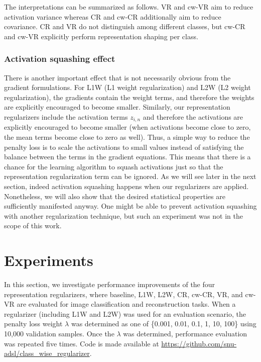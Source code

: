 The interpretations can be summarized as follows. VR and cw-VR aim to reduce activation variance whereas CR and cw-CR additionally aim to reduce covariance. CR and VR do not distinguish among different classes, but cw-CR and cw-VR explicitly perform representation shaping per class.

\subsubsection{Activation squashing effect}
There is another important effect that is not necessarily obvious from the gradient formulations.
For L1W (L1 weight regularization) and L2W (L2 weight regularization), the gradients contain the weight terms, and therefore the weights are explicitly encouraged to become smaller. Similarly, our representation regularizers include the activation terms $z_{i,n}$ and therefore the activations are explicitly encouraged to become smaller (when activations become close to zero, the mean terms become close to zero as well). Thus, a simple way to reduce the penalty loss is to scale the activations to small values instead of satisfying the balance between the terms in the gradient equations. 
This means that there is a chance for the learning algorithm to squash activations just so that the representation regularization term can be ignored. As we will see later in the next section, indeed activation squashing happens when our regularizers are applied. Nonetheless, we will also show that the desired statistical properties are sufficiently manifested anyway. One might be able to prevent activation squashing with another regularization technique, but such an experiment was not in the scope of this work. 



\section{Experiments}
\label{sec:experiments}
In this section, we investigate performance improvements of the four representation regularizers, where baseline, L1W, L2W, CR, cw-CR, VR, and cw-VR are evaluated for image classification and reconstruction tasks. When a regularizer (including L1W and L2W) was used for an evaluation scenario, the penalty loss weight $\lambda$ was determined as one of \{0.001, 0.01, 0.1, 1, 10, 100\} using 10,000 validation samples. Once the $\lambda$ was determined, performance evaluation was repeated five times. Code is made available at
\url{https://github.com/snu-adsl/class_wise_regularizer}.

